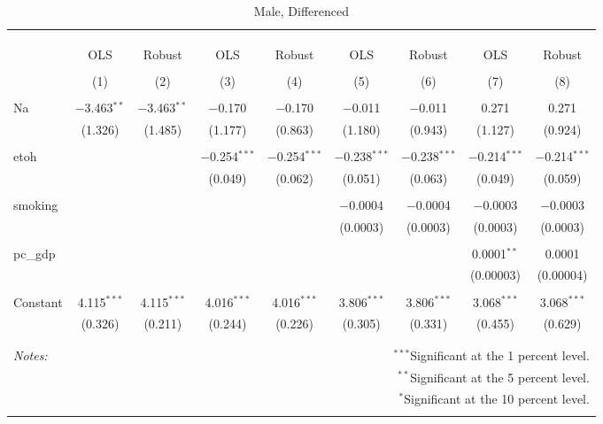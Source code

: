 \documentclass[11pt]{article}\usepackage[]{graphicx}\usepackage[]{color}
\begin{document}
\begin{table}[!htbp] \centering 
  \caption{Male, Differenced} 
  \label{} 
\begin{tabular}{@{\extracolsep{5pt}}lcccccccc} 
\\[-1.8ex]\hline 
\hline \\[-1.8ex] 
\\[-1.8ex] & \multicolumn{8}{c}{ } \\ 
 & OLS & Robust & OLS & Robust & OLS & Robust & OLS & Robust \\ 
\\[-1.8ex] & (1) & (2) & (3) & (4) & (5) & (6) & (7) & (8)\\ 
\hline \\[-1.8ex] 
 Na & $-$3.463$^{**}$ & $-$3.463$^{**}$ & $-$0.170 & $-$0.170 & $-$0.011 & $-$0.011 & 0.271 & 0.271 \\ 
  & (1.326) & (1.485) & (1.177) & (0.863) & (1.180) & (0.943) & (1.127) & (0.924) \\ 
  & & & & & & & & \\ 
 etoh &  &  & $-$0.254$^{***}$ & $-$0.254$^{***}$ & $-$0.238$^{***}$ & $-$0.238$^{***}$ & $-$0.214$^{***}$ & $-$0.214$^{***}$ \\ 
  &  &  & (0.049) & (0.062) & (0.051) & (0.063) & (0.049) & (0.059) \\ 
  & & & & & & & & \\ 
 smoking &  &  &  &  & $-$0.0004 & $-$0.0004 & $-$0.0003 & $-$0.0003 \\ 
  &  &  &  &  & (0.0003) & (0.0003) & (0.0003) & (0.0003) \\ 
  & & & & & & & & \\ 
 pc\_gdp &  &  &  &  &  &  & 0.0001$^{**}$ & 0.0001 \\ 
  &  &  &  &  &  &  & (0.00003) & (0.00004) \\ 
  & & & & & & & & \\ 
 Constant & 4.115$^{***}$ & 4.115$^{***}$ & 4.016$^{***}$ & 4.016$^{***}$ & 3.806$^{***}$ & 3.806$^{***}$ & 3.068$^{***}$ & 3.068$^{***}$ \\ 
  & (0.326) & (0.211) & (0.244) & (0.226) & (0.305) & (0.331) & (0.455) & (0.629) \\ 
  & & & & & & & & \\ 
\hline 
\hline \\[-1.8ex] 
\textit{Notes:} & \multicolumn{8}{r}{$^{***}$Significant at the 1 percent level.} \\ 
 & \multicolumn{8}{r}{$^{**}$Significant at the 5 percent level.} \\ 
 & \multicolumn{8}{r}{$^{*}$Significant at the 10 percent level.} \\ 
 & \multicolumn{8}{r}{} \\ 
\end{tabular} 
\end{table} 
\end{document}
